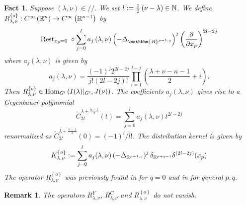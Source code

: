 \documentclass[reqno,12pt]{pja00} %
\newcommand{\Hom}{\mbox{\normalfont Hom}}
\newtheorem{remark}[theorem]{Remark}
\newtheorem{fact}[theorem]{Fact}
\theoremstyle{definition}
\theoremstyle{exampstyle} \newtheorem{examp}[theorem]{Theorem}
\begin{document}
\begin{fact}\label{fact:singo}
	Suppose $(\lambda,\nu)\in//$. We set $l:=\frac{1}{2}\left( \nu-\lambda \right)\in\mathbb{N}$.
	We define $R_{\lambda,\nu}^{ \left\{ o \right\}}:C^\infty\left( \mathbb{R}^n \right)\to C^\infty\left( \mathbb{R}^{n-1} \right)$ by
	\begin{equation*}
		\mbox{\normalfont Rest}_{x_p=0}\;\circ
	\sum_{j=0}^la_j\left( \lambda,\nu \right)\left(- \Delta_{\mathbbm{R}^{p-1,q}} \right)^j\left( \frac{\partial}{\partial x_p} \right)^{2l-2j}
	\end{equation*}
	where $a_j(\lambda,\nu)$ is given by\begin{equation*}
		a_j(\lambda,\nu)=\frac{(-1)^j2^{2l-2j}}{j!(2l-2j)!}\prod_{i=1}^{l-j}\left(\frac{\lambda+\nu-n-1}{2} 
		+i \right).
	\end{equation*}
	Then $R_{\lambda,\nu}^{ \left\{ o \right\}}\in\Hom_{G'}\left( I(\lambda)\kern-0.1cm\mid_{G'},J(\nu) \right)$.
	The coefficients $a_j(\lambda,\nu)$ gives rise to a Gegenbauer polynomial\begin{equation*}
		\tilde{C}_{2l}^{\lambda+\frac{n-1}{2}}(t)=\sum_{j=0}^la_j(\lambda,\nu)t^{2l-2j}
	\end{equation*}
	renormalized as $\tilde{C}_{2l}^{\lambda+\frac{n-1}{2}}(0)=\left( -1 \right)^l/l!$.
	The distribution kernel is given by
	\begin{equation*}
		K_{\lambda,\nu}^{ \left\{ o \right\} }:=\sum_{j=0}^la_j(\lambda,\nu)\left( -\Delta_{\R^{p-1,q}} \right)^j\delta_{\R^{p+q-1}}\delta^{\left( 2l-2j \right)}(x_p)
	\end{equation*}
	The operator $R_{\lambda,\nu}^{\left\{ o \right\}}$
	was previously found in \cite[Thms.\ 5.1.1 and 5.2.1]{juhl2009families} for $q=0$ and in \cite[Thm.\ 4.3]{kobayashi2015branching}
	for general $p,q$.
\end{fact}
\begin{remark}\label{rmk:thm:construction}
	The operators $R_{\lambda,\nu}^Y$, $R_{\lambda,\nu}^C$ and $R^{ \left\{ o \right\}}_{\lambda,\nu}$ do not vanish.
\end{remark}
\end{document}
